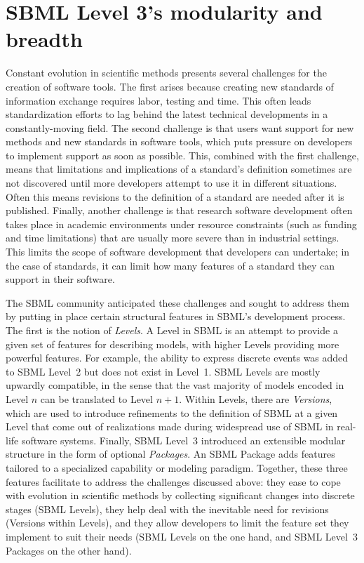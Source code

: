 \documentclass[]{draft-sbml-paper}
\begin{document}
\section*{SBML Level 3's modularity and breadth}\label{sec:modularity}

Constant evolution in scientific methods presents several challenges for the creation of software tools.  The first arises because creating new standards of information exchange requires labor, testing and time.  This often leads standardization efforts to lag behind the latest technical developments in a constantly-moving field.  The second challenge is that users want support for new methods and new standards in software tools, which puts pressure on developers to implement support as soon as possible.  This, combined with the first challenge, means that limitations and implications of a standard's definition sometimes are not discovered until more developers attempt to use it in different situations.  Often this means revisions to the definition of a standard are needed after it is published.  Finally, another challenge is that research software development often takes place in academic environments under resource constraints (such as funding and time limitations) that are usually more severe than in industrial settings.  This limits the scope of software development that developers can undertake; in the case of standards, it can limit how many features of a standard they can support in their software.


The SBML community anticipated these challenges and sought to address them by putting in place certain structural features in SBML's development process.  The first is the notion of \emph{Levels}.  A Level in SBML is an attempt to provide a given set of features for describing models, with higher Levels providing more powerful features.  For example, the ability to express discrete events was added to SBML Level~2 but does not exist in Level~1.  SBML Levels are mostly upwardly compatible, in the sense that the vast majority of models encoded in Level $n$ can be translated to Level $n+1$.  Within Levels, there are \emph{Versions}, which are used to introduce refinements to the definition of SBML at a given Level that come out of realizations made during widespread use of SBML in real-life software systems.  Finally, SBML Level~3 introduced an extensible modular structure in the form of optional \emph{Packages}.  An SBML Package adds features tailored to a specialized capability or modeling paradigm.  Together, these three features facilitate to address the challenges discussed above: they ease to cope with evolution in scientific methods by collecting significant changes into discrete stages (SBML Levels), they help deal with the inevitable need for revisions (Versions within Levels), and they allow developers to limit the feature set they implement to suit their needs (SBML Levels on the one hand, and SBML Level~3 Packages on the other hand).
\end{document}
